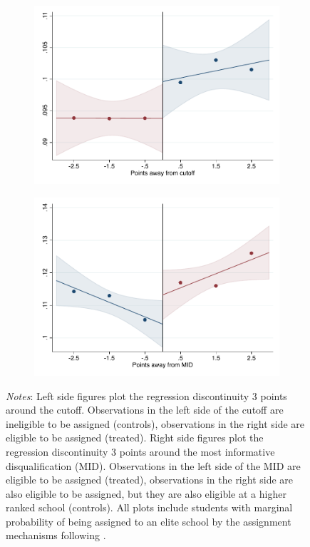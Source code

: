 \documentclass[oneside,11pt]{article}
\begin{document}
\begin{figure}[H]
\begin{center}
    \begin{subfigure}{0.475\textwidth}
        \centering
        \includegraphics[width=\textwidth]{04_Figures/rd_plot_tau_Secundaria_Privada_IPN3.pdf}
    \end{subfigure}
    \begin{subfigure}{0.475\textwidth}
        \centering
        \includegraphics[width=\textwidth]{04_Figures/rd_plot_mid_Secundaria_Privada_IPN3.pdf}
    \end{subfigure}
    \end{center}
    
\footnotesize
\textit{Notes}: Left side figures plot the regression discontinuity 3 points around the cutoff. Observations in the left side of the cutoff are ineligible to be assigned (controls), observations in the right side are eligible to be assigned (treated). Right side figures plot the regression discontinuity 3 points around the most informative disqualification (MID). Observations in the left side of the MID are eligible to be assigned (treated), observations in the right side are also eligible to be assigned, but they are also eligible at a higher ranked school (controls). All plots include students with marginal probability of being assigned to an elite school by the assignment mechanisms following \citet{abdulkadirouglu2022breaking}. 
\end{figure}
\end{document}
